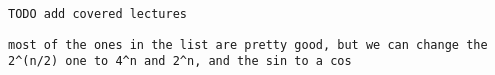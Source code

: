 \documentclass[handout]{mcs}
\begin{document}
\renewcommand{\reading}{
\begin{itemize}
\item
  Chapter~\bref{sec:coloring}--\bref{trees-sec}.\ \emph{Simple
    Graphs: Coloring, Connectedness}

\item Chapter~\bref{chap:asymptotics}
  through~\bref{sec:closed_products}.\ \emph{Sums \& Series}
  (omit~\bref{doublesum_sec})
\end{itemize}}


\begin{staffnotes}
\begin{verbatim}
TODO add covered lectures
\end{verbatim}
\end{staffnotes}

\begin{verbatim}
most of the ones in the list are pretty good, but we can change the 2^(n/2) one to 4^n and 2^n, and the sin to a cos
\end{verbatim}


\end{document}

